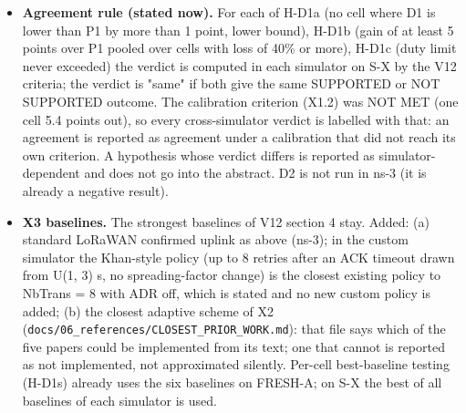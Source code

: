 \begin{itemize}
\item \textbf{Agreement rule (stated now).} For each of H-D1a (no cell where D1 is lower than P1 by more than 1 point, lower bound), H-D1b (gain of at least 5 points over P1 pooled over cells with loss of 40\% or more), H-D1c (duty limit never exceeded) the verdict is computed in each simulator on S-X by the V12 criteria; the verdict is "same" if both give the same SUPPORTED or NOT SUPPORTED outcome. The calibration criterion (X1.2) was NOT MET (one cell 5.4 points out), so every cross-simulator verdict is labelled with that: an agreement is reported as agreement under a calibration that did not reach its own criterion. A hypothesis whose verdict differs is reported as simulator-dependent and does not go into the abstract. D2 is not run in ns-3 (it is already a negative result).
\item \textbf{X3 baselines.} The strongest baselines of V12 section 4 stay. Added: (a) standard LoRaWAN confirmed uplink as above (ns-3); in the custom simulator the Khan-style policy (up to 8 retries after an ACK timeout drawn from U(1, 3) s, no spreading-factor change) is the closest existing policy to NbTrans = 8 with ADR off, which is stated and no new custom policy is added; (b) the closest adaptive scheme of X2 (\texttt{docs/06\_references/CLOSEST\_PRIOR\_WORK.md}): that file says which of the five papers could be implemented from its text; one that cannot is reported as not implemented, not approximated silently. Per-cell best-baseline testing (H-D1s) already uses the six baselines on FRESH-A; on S-X the best of all baselines of each simulator is used.
\end{itemize}

